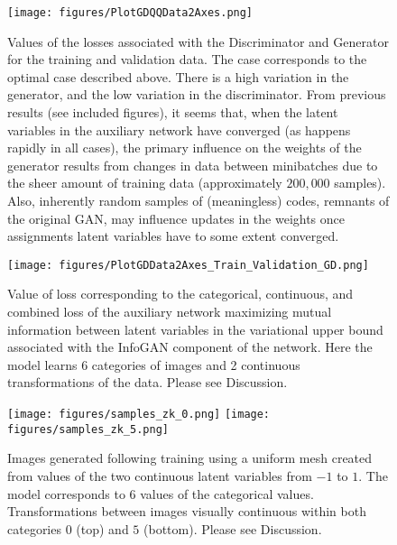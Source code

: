 \documentclass{article}
\begin{document}
\begin{figure}[h]
  \texttt{[image: figures/PlotGDQQData2Axes.png]}
  \caption{Values of the losses associated with the Discriminator and Generator for the training and validation data.  The case corresponds to the optimal case described above.  There is a high variation in the generator, and the low variation in the discriminator.  From previous results (see included figures), it seems that, when the latent variables in the auxiliary network have converged (as happens rapidly in all cases), the primary influence on the weights of the generator results from changes in data between minibatches due to the sheer amount of training data (approximately $200,000$ samples).  Also, inherently random samples of (meaningless) codes, remnants of the original GAN, may influence updates in the weights once assignments latent variables have to some extent converged.}
\end{figure}\label{}


\begin{figure}[h]
  \texttt{[image: figures/PlotGDData2Axes\_Train\_Validation\_GD.png]}
  \caption{Value of loss corresponding to the categorical, continuous, and combined loss of the auxiliary network maximizing mutual information between latent variables in the variational upper bound associated with the InfoGAN component of the network.  Here the model learns 6 categories of images and 2 continuous transformations of the data. Please see Discussion.}
\end{figure}\label{cat6gd}

\begin{figure}[h]
  \texttt{[image: figures/samples\_zk\_0.png]}
  \texttt{[image: figures/samples\_zk\_5.png]}
  \caption{Images generated following training using a uniform mesh created from values of the  two continuous latent variables from $-1$ to $1$.  The model corresponds to $6$ values of the categorical values.  Transformations between images visually continuous within both categories $0$ (top) and $5$ (bottom). Please see Discussion.}
\end{figure}\label{cat6samples}
\end{document}
